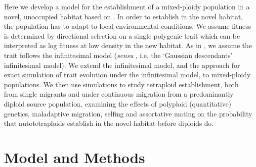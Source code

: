\documentclass[11pt,a4paper]{article}
\begin{document}
Here we develop a model for the establishment of a mixed-ploidy population in a
novel, unoccupied habitat based on \cite{barton2018}.
In order to establish in the novel habitat, the population has to adapt to
local environmental conditions.
We assume fitness is determined by directional selection on a single polygenic
trait which can be interpreted as log fitness at low density in the new
habitat.
As in \cite{barton2018}, we assume the trait follows the infinitesimal
model (\textit{sensu} \cite{barton2017}, i.e. the `Gaussian descendants'
infinitesimal model).
We extend the infinitesimal model, and the approach for exact simulation of
trait evolution under the infinitesimal model, to mixed-ploidy populations.
We then use simulations to study tetraploid establishment, both from single
migrants and under continuous migration from a predominantly diploid source
population, examining the effects of polyploid (quantitative) genetics,
maladaptive migration, selfing and assortative mating on the probability that
autotetraploids establish in the novel habitat before diploids do.


\section*{Model and Methods}
\end{document}
